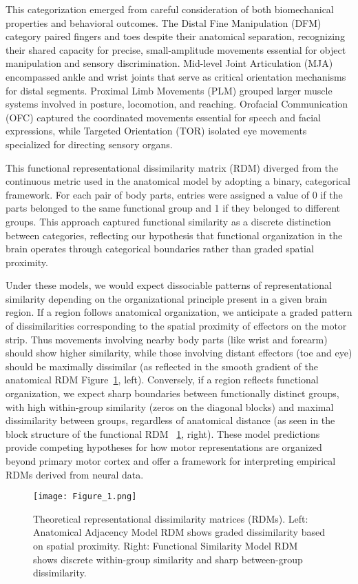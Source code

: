 \documentclass{article}
\begin{document}
This categorization emerged from careful consideration of both biomechanical properties and behavioral outcomes. The Distal Fine Manipulation (DFM) category paired fingers and toes despite their anatomical separation, recognizing their shared capacity for precise, small-amplitude movements essential for object manipulation and sensory discrimination. Mid-level Joint Articulation (MJA) encompassed ankle and wrist joints that serve as critical orientation mechanisms for distal segments. Proximal Limb Movements (PLM) grouped larger muscle systems involved in posture, locomotion, and reaching. Orofacial Communication (OFC) captured the coordinated movements essential for speech and facial expressions, while Targeted Orientation (TOR) isolated eye movements specialized for directing sensory organs.

This functional representational dissimilarity matrix (RDM) diverged from the continuous metric used in the anatomical model by adopting a binary, categorical framework. For each pair of body parts, entries were assigned a value of 0 if the parts belonged to the same functional group and 1 if they belonged to different groups. This approach captured functional similarity as a discrete distinction between categories, reflecting our hypothesis that functional organization in the brain operates through categorical boundaries rather than graded spatial proximity.

Under these models, we would expect dissociable patterns of representational similarity depending on the organizational principle present in a given brain region. If a region follows anatomical organization, we anticipate a graded pattern of dissimilarities corresponding to the spatial proximity of effectors on the motor strip. Thus movements involving nearby body parts (like wrist and forearm) should show higher similarity, while those involving distant effectors (toe and eye) should be maximally dissimilar (as reflected in the smooth gradient of the anatomical RDM Figure~\ref{fig:theoretical_rdms}, left). Conversely, if a region reflects functional organization, we expect sharp boundaries between functionally distinct groups, with high within-group similarity (zeros on the diagonal blocks) and maximal dissimilarity between groups, regardless of anatomical distance (as seen in the block structure of the functional RDM ~\ref{fig:theoretical_rdms}, right). These model predictions provide competing hypotheses for how motor representations are organized beyond primary motor cortex and offer a framework for interpreting empirical RDMs derived from neural data. 
\begin{figure}[!htbp]
\centering
\texttt{[image: Figure\_1.png]}
\caption{Theoretical representational dissimilarity matrices (RDMs). Left: Anatomical Adjacency Model RDM shows graded dissimilarity based on spatial proximity. Right: Functional Similarity Model RDM shows discrete within-group similarity and sharp between-group dissimilarity.}
\label{fig:theoretical_rdms}
\end{figure}
\end{document}
